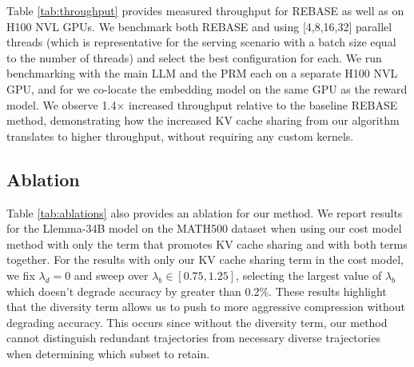 Table \ref{tab:throughput} provides measured throughput for REBASE as well as \ours on H100 NVL GPUs.
We benchmark both REBASE and \ours using [4,8,16,32] parallel threads (which is representative for the serving scenario with a batch size equal to the number of threads) and select the best configuration for each.
We run benchmarking with the main LLM and the PRM each on a separate H100 NVL GPU, and for \ours we co-locate the embedding model on the same GPU as the reward model.
We observe {1.4}$\times$ increased throughput relative to the baseline REBASE method, demonstrating how the increased KV cache sharing from our algorithm translates to higher throughput, without requiring any custom kernels.

\subsection{Ablation}

\begin{table}[t!]
\caption{
Ablation for our methodology. We include results on MATH500 for different beam widths with the Llemma-34B model, and we report KV budget estimates.
We compare \ours with only applying the KV budget term in the cost model (``\ours-KV'').
}
\scriptsize
\vspace{2.5mm}
\label{tab:ablations}
         
\end{table}

Table \ref{tab:ablations} also provides an ablation for our method.
We report results for the Llemma-34B model on the MATH500 dataset when using our cost model method with only the term that promotes KV cache sharing and with both terms together.
For the results with only our KV cache sharing term in the cost model, we fix $\lambda_d = 0$ and sweep over $\lambda_b \in [0.75,1.25]$, selecting the largest value of $\lambda_b$ which doesn't degrade accuracy by greater than $0.2\%$.
These results highlight that the diversity term allows us to push to more aggressive compression without degrading accuracy.
This occurs since without the diversity term, our method cannot distinguish redundant trajectories from necessary diverse trajectories when determining which subset to retain.

